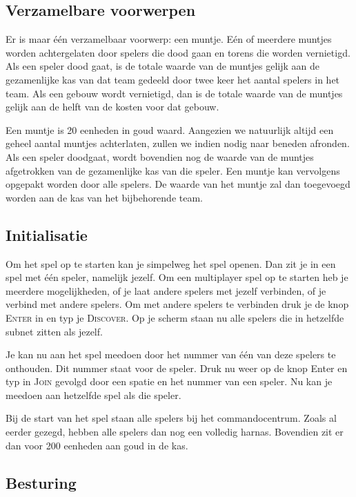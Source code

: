     \subsection{Verzamelbare voorwerpen}
    Er is maar \'e\'en verzamelbaar voorwerp: een muntje. E\'en of meerdere muntjes worden achtergelaten door spelers die dood gaan en torens die worden vernietigd. Als een speler dood gaat, is de totale waarde van de muntjes gelijk aan de gezamenlijke kas van dat team gedeeld door twee keer het aantal spelers in het team. Als een gebouw wordt vernietigd, dan is de totale waarde van de muntjes gelijk aan de helft van de kosten voor dat gebouw.

    Een muntje is 20 eenheden in goud waard. Aangezien we natuurlijk altijd een geheel aantal muntjes achterlaten, zullen we indien nodig naar beneden afronden. Als een speler doodgaat, wordt bovendien nog de waarde van de muntjes afgetrokken van de gezamenlijke kas van die speler. Een muntje kan vervolgens opgepakt worden door alle spelers. De waarde van het muntje zal dan toegevoegd worden aan de kas van het bijbehorende team.

    \subsection{Initialisatie}
	Om het spel op te starten kan je simpelweg het spel openen. Dan zit je in een spel met \'e\'en speler, namelijk jezelf. Om een multiplayer spel op te starten heb je meerdere mogelijkheden, of je laat andere spelers met jezelf verbinden, of je verbind met andere spelers. Om met andere spelers te verbinden druk je de knop \textsc{Enter} in en typ je \textsc{Discover}. Op je scherm staan nu alle spelers die in hetzelfde subnet zitten als jezelf.
	
	Je kan nu aan het spel meedoen door het nummer van \'e\'en van deze spelers te onthouden. Dit nummer staat voor de speler. Druk nu weer op de knop {Enter} en typ in \textsc{Join} gevolgd door een spatie en het nummer van een speler. Nu kan je meedoen aan hetzelfde spel als die speler.
	
    Bij de start van het spel staan alle spelers bij het commandocentrum. Zoals al eerder gezegd, hebben alle spelers dan nog een volledig harnas. Bovendien zit er dan voor 200 eenheden aan goud in de kas.

    \FloatBarrier

    \subsection{Besturing}
    \label{sec:UI}

